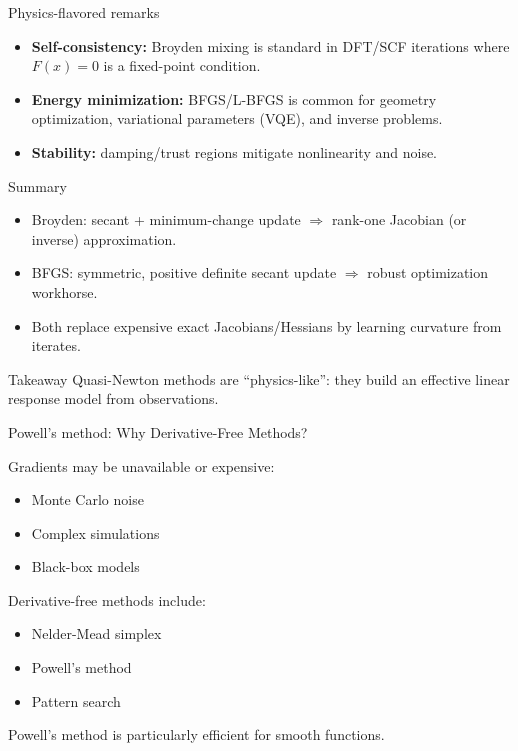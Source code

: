 \documentclass[aspectratio=169]{beamer}
\begin{document}
\begin{frame}{Physics-flavored remarks}
\begin{itemize}
\item \textbf{Self-consistency:} Broyden mixing is standard in DFT/SCF iterations where $F(x)=0$ is a fixed-point condition.
\item \textbf{Energy minimization:} BFGS/L-BFGS is common for geometry optimization, variational parameters (VQE), and inverse problems.
\item \textbf{Stability:} damping/trust regions mitigate nonlinearity and noise.
\end{itemize}
\end{frame}

\begin{frame}{Summary}
\begin{itemize}
\item Broyden: secant + minimum-change update $\Rightarrow$ rank-one Jacobian (or inverse) approximation.
\item BFGS: symmetric, positive definite secant update $\Rightarrow$ robust optimization workhorse.
\item Both replace expensive exact Jacobians/Hessians by learning curvature from iterates.
\end{itemize}

\begin{block}{Takeaway}
Quasi-Newton methods are ``physics-like'': they build an effective linear response model from observations.
\end{block}
\end{frame}


\begin{frame}{Powell's method: Why Derivative-Free Methods?}

Gradients may be unavailable or expensive:

\begin{itemize}
\item Monte Carlo noise
\item Complex simulations
\item Black-box models
\end{itemize}

Derivative-free methods include:

\begin{itemize}
\item Nelder-Mead simplex
\item Powell's method
\item Pattern search
\end{itemize}

Powell's method is particularly efficient for smooth functions.
\end{frame}
\end{document}
